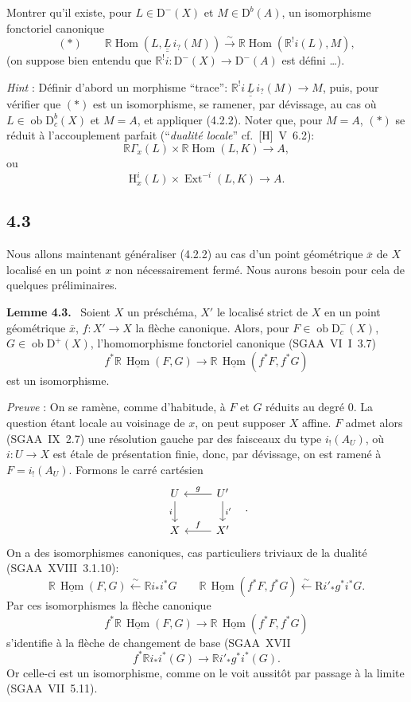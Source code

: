 \documentclass[11pt]{article}
\newenvironment{statement}[1]{\par\medskip\noindent\textbf{#1.}\ }{\par\medskip}
\renewcommand{\H}{\mathrm{H}}
\DeclareMathOperator{\Hom}{Hom}
\DeclareMathOperator{\Ext}{Ext}
\newcommand{\R}{\mathbb{R}}\newcommand{\RHomCore}{\mathbb{R}\mathrm{Hom}}
\newcommand{\D}{\mathrm{D}}
\newcommand{\ob}{\operatorname{ob}}
\newcommand{\ol}[1]{\overline{#1}}
\providecommand{\Hom}{\operatorname{Hom}}
\providecommand{\ob}{\operatorname{ob}}
\providecommand{\R}{\mathrm R}
\providecommand{\Hom}{\operatorname{Hom}}
\begin{document}
Montrer qu'il existe, pour $L\in\D^-(X)$ et $M\in\D^b(A)$, un isomorphisme fonctoriel canonique
\[
(*)\qquad \R\Hom(L,\underline{\underline{L}}\, i_?(M))\xrightarrow{\sim}\R\Hom(\R^{!}i(L),M),
\]
(on suppose bien entendu que $\R^{!}i:\D^-(X)\to\D^-(A)$ est défini \dots).

\emph{Hint} : Définir d'abord un morphisme ``trace'': $\R^{!}i\,\underline{\underline{L}}\, i_?(M)\to M$, puis, pour vérifier que $(*)$ est un isomorphisme, se ramener, par dévissage, au cas où $L\in\ob\D_c^b(X)$ et $M=A$, et appliquer (4.2.2). Noter que, pour $M=A$, $(*)$ se réduit à l'accouplement parfait (``\emph{dualité locale}'' cf.~[H]~V~6.2):
\[
\R\Gamma_x(L)\times \R\Hom(L,K)\longrightarrow A,
\]
ou
\[
\H_x^i(L)\times \Ext^{-i}(L,K)\longrightarrow A.
\]

\subsection*{4.3}
Nous allons maintenant généraliser (4.2.2) au cas d'un point géométrique $\ol{x}$ de $X$ localisé en un point $x$ non nécessairement fermé. Nous aurons besoin pour cela de quelques préliminaires.

\begin{statement}{Lemme 4.3}
Soient $X$ un préschéma, $X'$ le localisé strict de $X$ en un point géométrique $\ol{x}$, $f:X'\to X$ la flèche canonique. Alors, pour $F\in\ob\D_c^-(X)$, $G\in\ob\D^+(X)$, l'homomorphisme fonctoriel canonique (SGAA~VI~I~3.7)
\[
f^*\R\,\underline{\Hom}(F,G)\longrightarrow \R\,\underline{\Hom}(f^*F,f^*G)
\]
est un isomorphisme.
\end{statement}

\emph{Preuve} : On se ramène, comme d'habitude, à $F$ et $G$ réduits au degré $0$. La question étant locale au voisinage de $x$, on peut supposer $X$ affine. $F$ admet alors (SGAA~IX~2.7) une résolution gauche par des faisceaux du type $i_!(A_U)$, où $i:U\to X$ est étale de présentation finie, donc, par dévissage, on est ramené à $F=i_!(A_U)$. Formons le carré cartésien
\[
\begin{tikzcd}
U \arrow[d,"i"'] & U' \arrow[l,"g"'] \arrow[d,"i'"] \\
X & X' \arrow[l,"f"']
\end{tikzcd}\quad .
\]
On a des isomorphismes canoniques, cas particuliers triviaux de la dualité (SGAA~XVIII~3.1.10):
\[
\R\,\underline{\Hom}(F,G)\xleftarrow{\sim}\R i_* i^*G
\qquad
\R\,\underline{\Hom}(f^*F,f^*G)\xleftarrow{\sim}\mathrm{R} i'_* g^*i^*G.
\]
Par ces isomorphismes la flèche canonique
\[
f^*\R\,\underline{\Hom}(F,G)\longrightarrow \R\,\underline{\Hom}(f^*F,f^*G)
\]
s'identifie à la flèche de changement de base (SGAA~XVII
\[
f^*\R i_*i^*(G)\longrightarrow \R i'_*g^*i^*(G).
\]
Or
celle-ci est un isomorphisme, comme on le voit aussitôt par passage à la limite (SGAA~VII~5.11).
\end{document}
